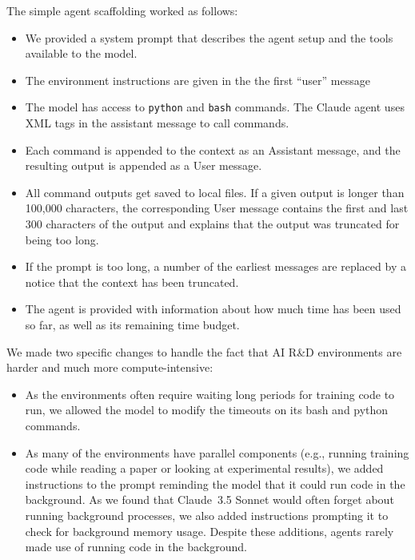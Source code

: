 \documentclass{article}
\begin{document}
The simple agent scaffolding worked as follows:
\begin{itemize}
\item We provided a system prompt that describes the agent setup and the tools available to the model. 
\item The environment instructions are given in the the first ``user'' message
\item The model has access to \texttt{python} and \texttt{bash} commands. The Claude agent uses XML tags in the assistant message to call commands.
\item Each command is appended to the context as an Assistant message, and the resulting output is appended as a User message.
\item All command outputs get saved to local files. If a given output is longer than 100,000 characters, the corresponding User message contains the first and last 300 characters of the output and explains that the output was truncated for being too long. 
\item If the prompt is too long, a number of the earliest messages are replaced by a notice that the context has been truncated. 
\item The agent is provided with information about how much time has been used so far, as well as its remaining time budget. 
\end{itemize}

We made two specific changes to handle the fact that AI R\&D environments are harder and much more compute-intensive:
\begin{itemize}
    \item  As the environments often require waiting long periods for training code to run, we allowed the model to modify the timeouts on its bash and python commands. 
    \item As many of the environments have parallel components (e.g., running training code while reading a paper or looking at experimental results), we added instructions to the prompt reminding the model that it could run code in the background. As we found that Claude~3.5 Sonnet would often forget about running background processes, we also added instructions prompting it to check for background memory usage. Despite these additions, agents rarely made use of running code in the background.
\end{itemize}
\end{document}
